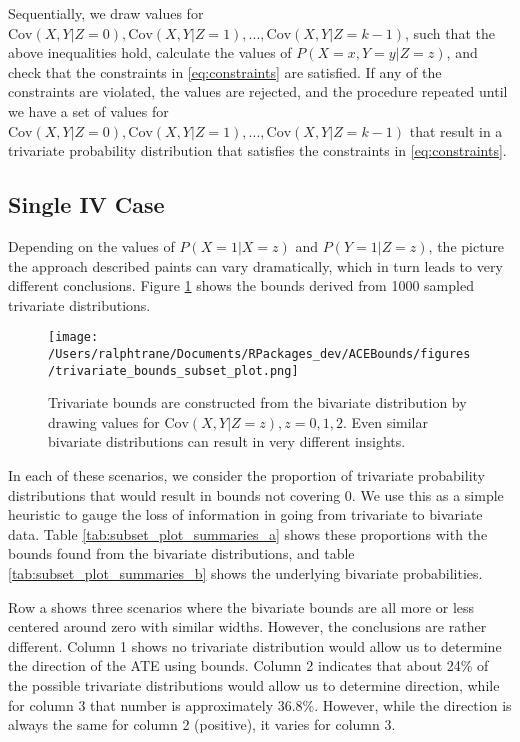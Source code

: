 \documentclass[
]{article}
\theoremstyle{plain}
\begin{document}
Sequentially, we draw values for \(\text{Cov}(X, Y | Z = 0), \text{Cov}(X, Y | Z = 1), ..., \text{Cov}(X, Y | Z = k-1)\), such that the above inequalities hold, calculate the values of \(P(X = x, Y = y | Z = z)\), and check that the constraints in \eqref{eq:constraints} are satisfied. If any of the constraints are violated, the values are rejected, and the procedure repeated until we have a set of values for \(\text{Cov}(X, Y | Z = 0), \text{Cov}(X, Y | Z = 1), ..., \text{Cov}(X, Y | Z = k-1)\) that result in a trivariate probability distribution that satisfies the constraints in \eqref{eq:constraints}.

\hypertarget{single-iv-case}{%
\subsection{Single IV Case}\label{single-iv-case}}

Depending on the values of \(P(X = 1 | X = z)\) and \(P(Y = 1 | Z = z)\), the picture the approach described paints can vary dramatically, which in turn leads to very different conclusions. Figure \ref{fig:trivariate_bounds} shows the bounds derived from 1000 sampled trivariate distributions.

\begin{figure}[!h]
  \center
  \texttt{[image: /Users/ralphtrane/Documents/RPackages\_dev/ACEBounds/figures/trivariate\_bounds\_subset\_plot.png]}
  \caption{Trivariate bounds are constructed from the bivariate distribution by drawing values for $\text{Cov}(X,Y|Z=z),z=0,1,2$. Even similar bivariate distributions can result in very different insights.}
  \label{fig:trivariate_bounds}
\end{figure}

In each of these scenarios, we consider the proportion of trivariate probability distributions that would result in bounds not covering 0. We use this as a simple heuristic to gauge the loss of information in going from trivariate to bivariate data. Table \ref{tab:subset_plot_summaries_a} shows these proportions with the bounds found from the bivariate distributions, and table \ref{tab:subset_plot_summaries_b} shows the underlying bivariate probabilities.

Row a shows three scenarios where the bivariate bounds are all more or less centered around zero with similar widths. However, the conclusions are rather different. Column 1 shows no trivariate distribution would allow us to determine the direction of the ATE using bounds. Column 2 indicates that about 24\% of the possible trivariate distributions would allow us to determine direction, while for column 3 that number is approximately 36.8\%. However, while the direction is always the same for column 2 (positive), it varies for column 3.
\end{document}
